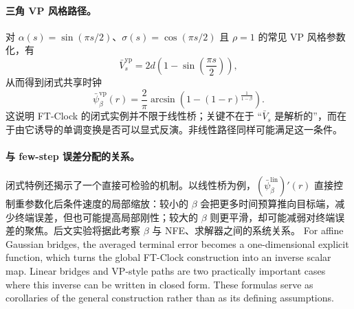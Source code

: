\paragraph{三角 VP 风格路径。}
对 $\alpha(s)=\sin(\pi s/2)$、$\sigma(s)=\cos(\pi s/2)$ 且 $\rho=1$ 的常见 VP 风格参数化，有
\begin{equation}
  \bar{V}^{\mathrm{vp}}_s = 2d\left(1-\sin\left(\frac{\pi s}{2}\right)\right),
\end{equation}
从而得到闭式共享时钟
\begin{equation}
 \bar{\psi}^{\mathrm{vp}}_{\beta}(r)
  =
  \frac{2}{\pi}
  \arcsin\left(1-(1-r)^{\frac{1}{1-\beta}}\right).
  \label{eq:vp-clock}
\end{equation}
这说明 FT-Clock 的闭式实例并不限于线性桥；关键不在于 ``$\bar{V}_s$ 是解析的''，而在于由它诱导的单调变换是否可以显式反演。非线性路径同样可能满足这一条件。

\paragraph{与 few-step 误差分配的关系。}
闭式特例还揭示了一个直接可检验的机制。以线性桥为例，$(\bar{\psi}^{\mathrm{lin}}_{\beta})'(r)$ 直接控制重参数化后条件速度的局部缩放：较小的 $\beta$ 会把更多时间预算推向目标端，减少终端误差，但也可能提高局部刚性；较大的 $\beta$ 则更平滑，却可能减弱对终端误差的聚焦。后文实验将据此考察 $\beta$ 与 NFE、求解器之间的系统关系。
\else
For affine Gaussian bridges, the averaged terminal error becomes a one-dimensional explicit function, which turns the global FT-Clock construction into an inverse scalar map. Linear bridges and VP-style paths are two practically important cases where this inverse can be written in closed form. These formulas serve as corollaries of the general construction rather than as its defining assumptions.
\fi
